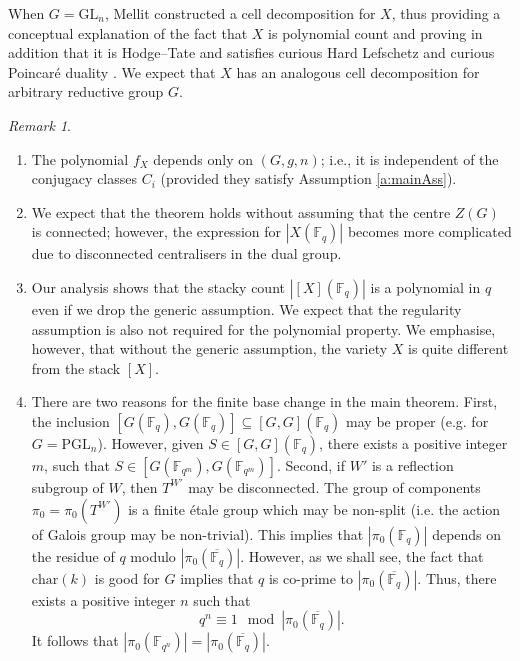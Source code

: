 \documentclass[12pt]{amsart}
\theoremstyle{plain}
\theoremstyle{definition}
\theoremstyle{remark}
\newtheorem{rem}[thm]{Remark}
\newcommand{\bX}{{X}}
\newcommand{\GL}{\mathrm{GL}}
\newcommand{\PGL}{\mathrm{PGL}}
\newcommand{\Fq}{\mathbb{F}_q}
\begin{document}
 When $G=\GL_n$, Mellit constructed a cell decomposition for $\bX$, thus providing a conceptual explanation of the fact that $\bX$ is polynomial count and proving in addition that it is Hodge--Tate and satisfies curious Hard Lefschetz and curious Poincar\'{e} duality \cite{MellitDecomposition}. We expect that $\bX$ has an analogous cell decomposition for arbitrary reductive group $G$.  
 
 






\begin{rem} 
\begin{enumerate} \label{r:main}

\item[(i)] The polynomial $f_X$ depends only on $(G,g,n)$; i.e., it is independent of the conjugacy classes $C_i$ (provided they satisfy Assumption \ref{a:mainAss}).


\item[(ii)] We expect that the theorem holds without assuming that the centre $Z(G)$ is connected; however, the expression for $|X(\Fq)|$ becomes more complicated due to disconnected centralisers in the dual group. 
\item [(iii)] Our analysis shows that the stacky count  $|[\bX](\Fq)|$ is a polynomial in $q$ even if we drop the generic assumption. We expect that the regularity assumption is also not required for the polynomial property. We emphasise, however, that without the generic assumption, the variety $X$ is quite different from the stack $[X]$. 


\item[(iv)] There are two reasons for the finite base change in the main theorem.  First, the inclusion $[G(\Fq), G(\Fq)] \subseteq [G,G](\Fq)$ may be proper (e.g. for $G=\PGL_n$). However, given $S\in [G,G](\Fq)$, there exists a positive integer $m$, such that  $S\in [G(\mathbb{F}_{q^m}), G(\mathbb{F}_{q^m})]$. 
Second, if $W'$ is a reflection subgroup of $W$, then $T^{W'}$ may be disconnected. The group of components $\pi_0=\pi_0(T^{W'})$ is a finite \'etale group which may be non-split (i.e. the action of Galois group may be non-trivial). This implies that $|\pi_0(\Fq)|$ depends on the residue of $q$ modulo $|\pi_0(\overline{\Fq})|$. However, as we shall see, the fact that $\mathrm{char}(k)$ is good for $G$ implies that $q$ is co-prime to $|\pi_0(\overline{\Fq})|$. Thus, there exists a positive integer $n$ such that 
\[
q^n \equiv 1 \mod |\pi_0(\overline{\Fq})|.
\]
It follows that $|\pi_0(\mathbb{F}_{q^n})|=|\pi_0(\overline{\Fq})|$.


\end{enumerate} 
\end{rem} 
\end{document}
